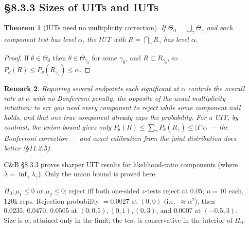 \documentclass[11pt]{article}
\newtheorem{theorem}{Theorem}[section]
\newtheorem{remark}[theorem]{Remark}
\begin{document}
\subsection{\S8.3.3 Sizes of UITs and IUTs}
\begin{theorem}[IUTs need no multiplicity correction]
If $\Theta_0=\bigcup_\gamma\Theta_\gamma$ and each component test has level $\alpha$, the IUT with $R=\bigcap_\gamma R_\gamma$ has level $\alpha$.
\end{theorem}
\begin{proof}
If $\theta\in\Theta_0$ then $\theta\in\Theta_{\gamma_0}$ for some $\gamma_0$, and $R\subset R_{\gamma_0}$, so $P_\theta(R)\le P_\theta(R_{\gamma_0})\le\alpha$.
\end{proof}
\begin{remark}
Requiring several endpoints each significant at $\alpha$ controls the overall rate at $\alpha$ with no Bonferroni penalty, the opposite of the usual multiplicity intuition: to err you need every component to reject while some component null holds, and that one true component already caps the probability. For a UIT, by contrast, the union bound gives only $P_\theta(R)\le\sum_\gamma P_\theta(R_\gamma)\le|\Gamma|\alpha$ --- the Bonferroni correction --- and exact calibration from the joint distribution does better (\S11.2.5).
\end{remark}
\begin{flagbox}
C\&B \S8.3.3 proves sharper UIT results for likelihood-ratio components (where $\lambda=\inf_\gamma\lambda_\gamma$). Only the union bound is proved here.
\end{flagbox}
\begin{simbox}
$H_0:\mu_1\le0$ or $\mu_2\le0$; reject iff both one-sided $z$-tests reject at $0.05$; $n=10$ each, 120k reps. Rejection probability $=0.0027$ at $(0,0)$ (i.e.\ $\approx\alpha^2$), then $0.0235,\,0.0470,\,0.0505$ at $(0,0.5),(0,1),(0,3)$, and $0.0007$ at $(-0.5,3)$. Size is $\alpha$, attained only in the limit; the test is conservative in the interior of $H_0$.
\end{simbox}
\end{document}
